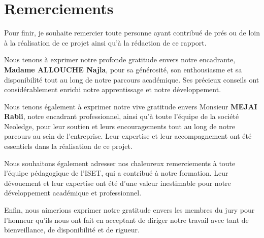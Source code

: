 \section*{Remerciements}

\bigskip
Pour finir, je souhaite remercier toute personne ayant contribué de prés ou de loin à la réalisation de ce projet ainsi qu'à la rédaction de ce rapport.
\bigskip

Nous tenons à exprimer notre profonde gratitude envers notre encadrante, \textbf{Madame ALLOUCHE Najla}, pour sa générosité, son enthousiasme et sa disponibilité tout au long de notre parcours académique. Ses précieux conseils ont considérablement enrichi notre apprentissage et notre développement.

\bigskip
Nous tenons également à exprimer notre vive gratitude envers Monsieur \textbf{MEJAI Rabii}, notre encadrant professionnel, ainsi qu'à toute l'équipe de la société Neoledge, pour leur soutien et leurs encouragements tout au long de notre parcours au sein de l'entreprise. Leur expertise et leur accompagnement ont été essentiels dans la réalisation de ce projet. 
\bigskip

Nous souhaitons également adresser nos chaleureux remerciements à toute l'équipe pédagogique de l'ISET, qui a contribué à notre formation. Leur dévouement et leur expertise ont été d'une valeur inestimable pour notre développement académique et professionnel.
\bigskip

Enfin, nous aimerions exprimer notre gratitude envers les membres du jury pour l'honneur qu'ils nous ont fait en acceptant de diriger notre travail avec tant de bienveillance, de disponibilité et de rigueur. 

\clearpage